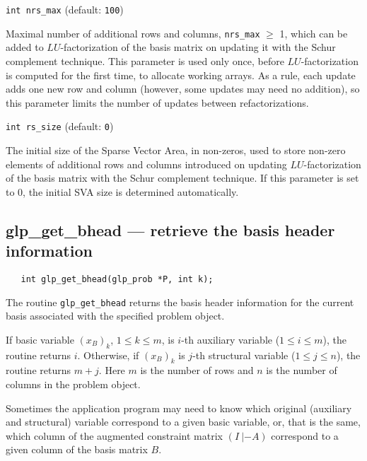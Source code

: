 \medskip

{\tt int nrs\_max} (default: {\tt 100})

Maximal number of additional rows and columns, \verb|nrs_max| $\geq$ 1,
which can be added to $LU$-factorization of the basis matrix on
updating it with the Schur complement technique. This parameter is used
only once, before $LU$-factorization is computed for the first time, to
allocate working arrays. As a rule, each update adds one new row and
column (however, some updates may need no addition), so this parameter
limits the number of updates between refactorizations.

\medskip

{\tt int rs\_size} (default: {\tt 0})

The initial size of the Sparse Vector Area, in non-zeros, used to
store non-zero elements of additional rows and columns introduced on
updating $LU$-factorization of the basis matrix with the Schur
complement technique. If this parameter is set to 0, the initial SVA
size is determined automatically.

\newpage

\subsection{glp\_get\_bhead --- retrieve the basis header information}

\synopsis

\begin{verbatim}
   int glp_get_bhead(glp_prob *P, int k);
\end{verbatim}

\description

The routine \verb|glp_get_bhead| returns the basis header information
for the current basis associated with the specified problem object.

\returns

If basic variable $(x_B)_k$, $1\leq k\leq m$, is $i$-th auxiliary
variable ($1\leq i\leq m$), the routine returns $i$. Otherwise, if
$(x_B)_k$ is $j$-th structural variable ($1\leq j\leq n$), the routine
returns $m+j$. Here $m$ is the number of rows and $n$ is the number of
columns in the problem object.


Sometimes the application program may need to know which original
(auxiliary and structural) variable correspond to a given basic
variable, or, that is the same, which column of the augmented
constraint matrix $(I\ |-\!A)$ correspond to a given column of the
basis matrix $B$.

